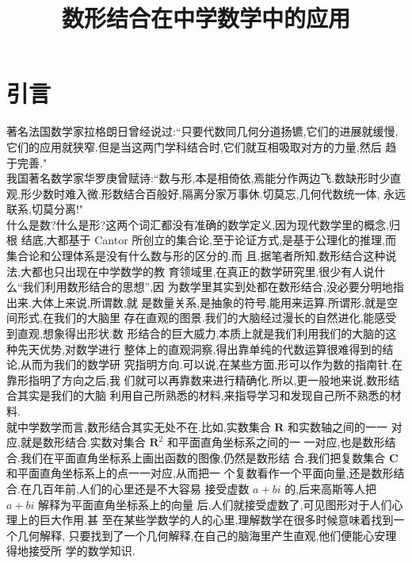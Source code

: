 \documentclass[a4paper]{article}
\begin{document}
\date{}
\title{\huge{\bf{数形结合在中学数学中的应用}}}
\maketitle

\section{引言}
\label{sec:1}


著名法国数学家拉格朗日曾经说过:“只要代数同几何分道扬镳,它们的进展就缓慢,
它们的应用就狭窄.但是当这两门学科结合时,它们就互相吸取对方的力量,然后
趋于完善."\\

我国著名数学家华罗庚曾赋诗:“数与形,本是相倚依,焉能分作两边飞.数缺形时少直
观,形少数时难入微.形数结合百般好,隔离分家万事休.切莫忘,几何代数统一体,
永远联系,切莫分离!"\\

什么是数?什么是形?这两个词汇都没有准确的数学定义,因为现代数学里的概念,归根
结底,大都基于 Cantor 所创立的集合论,至于论证方式,是基于公理化的推理,而
集合论和公理体系是没有什么数与形的区分的.而
且,据笔者所知,数形结合这种说法,大都也只出现在中学数学的教
育领域里,在真正的数学研究里,很少有人说什么“我们利用数形结合的思想”,因
为数学里其实到处都在数形结合,没必要分明地指出来.大体上来说,所谓数,就
是数量关系,是抽象的符号,能用来运算.所谓形,就是空间形式,在我们的大脑里
存在直观的图景.我们的大脑经过漫长的自然进化,能感受到直观,想象得出形状.数
形结合的巨大威力,本质上就是我们利用我们的大脑的这种先天优势,对数学进行
整体上的直观洞察,得出靠单纯的代数运算很难得到的结论,从而为我们的数学研
究指明方向.可以说,在某些方面,形可以作为数的指南针.在靠形指明了方向之后,我
们就可以再靠数来进行精确化.所以,更一般地来说,数形结合其实是我们的大脑
利用自己所熟悉的材料,来指导学习和发现自己所不熟悉的材料.\\

就中学数学而言,数形结合其实无处不在.比如,实数集合 $\mathbf{R}$ 和实数轴之间的一一
对应,就是数形结合.实数对集合 $\mathbf{R}^2$ 和平面直角坐标系之间的一
一对应,也是数形结合.我们在平面直角坐标系上画出函数的图像,仍然是数形结
合.我们把复数集合 $\mathbf{C}$ 和平面直角坐标系上的点一一对应,从而把一
个复数看作一个平面向量,还是数形结合.在几百年前,人们的心里还是不大容易
接受虚数 $a+bi$ 的,后来高斯等人把 $a+bi$ 解释为平面直角坐标系上的向量
后,人们就接受虚数了,可见图形对于人们心理上的巨大作用.甚
至在某些学数学的人的心里,理解数学在很多时候意味着找到一个几何解释,
只要找到了一个几何解释,在自己的脑海里产生直观,他们便能心安理得地接受所
学的数学知识.\\
\end{document}
